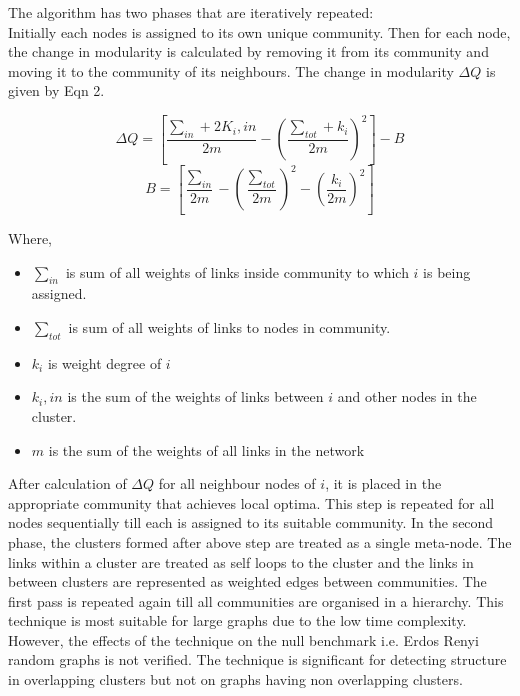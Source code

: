 The algorithm has two phases that are iteratively repeated:\\
Initially each nodes is assigned to its own unique community. Then for each node, the change in modularity is calculated by removing it from its community and moving it to the community of its neighbours. The change in modularity $\Delta Q$ is given by Eqn 2.

\begin{equation}
\Delta Q = [\frac{\sum_{in}^{}+2K_i,in}{2m} - (\frac{\sum_{tot} + k_i}{2m} )^2] - B
\end{equation}
\begin{equation}
B = [\frac{\sum_{in}^{}}{2m} - (\frac{\sum_{tot}^{}}{2m})^2 - (\frac{k_i}{2m})^2] 
\end{equation}

Where,
\begin{itemize}
\item $\sum_{in}$ is sum of all weights of links inside community to which $i$ is being assigned.
\item $\sum_{tot}$ is sum of all weights of links to nodes in community.
\item $k_i$ is weight degree of $i$
\item $k_i,in$ is the sum of the weights of links between $i$ and other nodes in the cluster.
\item $m$ is the sum of the weights of all links in the network
\end{itemize}

After calculation of $\Delta Q$ for all neighbour nodes of $i$, it is placed in the appropriate community that achieves local optima. This step is repeated for all nodes sequentially till each is assigned to its suitable community. In the second phase, the clusters formed after above step are treated as a single meta-node. The links within a cluster are treated as self loops to the cluster and the links in between clusters are represented as weighted edges between communities. The first pass is repeated again till all communities are organised in a hierarchy. This technique is most suitable for large graphs due to the low time complexity. However, the effects of the technique on the null benchmark i.e. Erdos Renyi random graphs is not verified. The technique is significant for detecting structure in overlapping clusters but not on graphs having non overlapping clusters.

